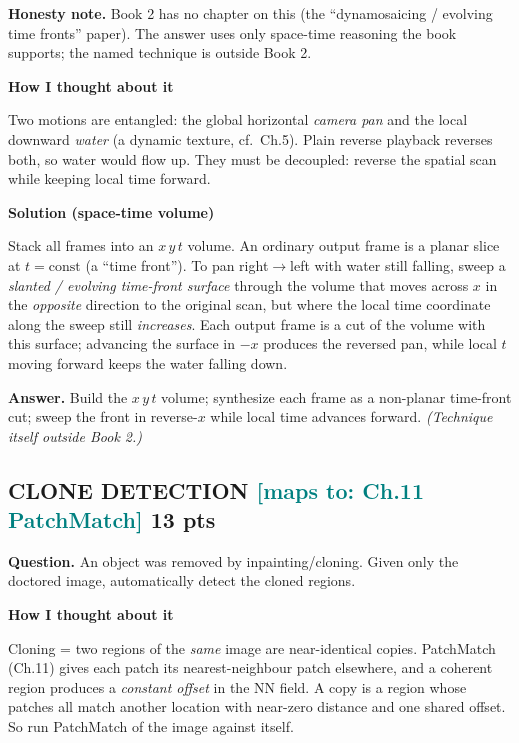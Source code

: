 \documentclass[11pt]{article}
\newcommand{\step}[1]{\smallskip\par\noindent\textbf{\textcolor{amber}{#1}}\par\nobreak}
\newcommand{\maps}[1]{{\small\textcolor{teal}{[maps to: #1]}}}
\newcommand{\ans}[1]{\begin{answer}\textbf{Answer.} #1\end{answer}}
\begin{document}
\begin{notebox}\textbf{Honesty note.} Book 2 has no chapter on this (the ``dynamosaicing / evolving time fronts''
paper). The answer uses only space-time reasoning the book supports; the named technique is outside Book 2.\end{notebox}

\step{How I thought about it}
Two motions are entangled: the global horizontal \emph{camera pan} and the local downward \emph{water} (a dynamic
texture, cf.\ Ch.5). Plain reverse playback reverses both, so water would flow up. They must be decoupled: reverse
the spatial scan while keeping local time forward.

\step{Solution (space-time volume)}
Stack all frames into an $x\,y\,t$ volume. An ordinary output frame is a planar slice at $t=\text{const}$ (a
``time front''). To pan right$\to$left with water still falling, sweep a \emph{slanted / evolving time-front
surface} through the volume that moves across $x$ in the \emph{opposite} direction to the original scan, but where
the local time coordinate along the sweep still \emph{increases}. Each output frame is a cut of the volume with
this surface; advancing the surface in $-x$ produces the reversed pan, while local $t$ moving forward keeps the
water falling down.
\ans{Build the $x\,y\,t$ volume; synthesize each frame as a non-planar time-front cut; sweep the front in
reverse-$x$ while local time advances forward. \emph{(Technique itself outside Book 2.)}}

\subsection{CLONE DETECTION \hfill \maps{Ch.11 PatchMatch} \hfill \textnormal{\small 13 pts}}
\begin{qbox}\textbf{Question.} An object was removed by inpainting/cloning. Given only the doctored image,
automatically detect the cloned regions.\end{qbox}

\step{How I thought about it}
Cloning = two regions of the \emph{same} image are near-identical copies. PatchMatch (Ch.11) gives each patch its
nearest-neighbour patch elsewhere, and a coherent region produces a \emph{constant offset} in the NN field. A copy
is a region whose patches all match another location with near-zero distance and one shared offset. So run
PatchMatch of the image against itself.
\end{document}
